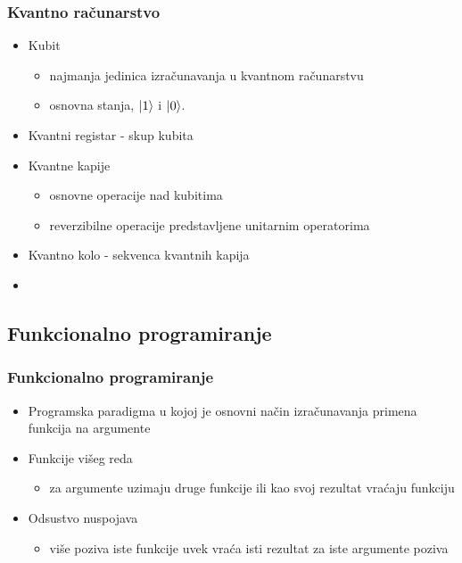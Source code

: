 \documentclass[12pt,hyperref={unicode}]{beamer}
\begin{document}

\begin{frame}
\frametitle{Kvantno računarstvo}
\begin{itemize}
\item{Kubit}
\begin{itemize}
    \item{najmanja jedinica izračunavanja u kvantnom računarstvu}\\
    \item{osnovna stanja, $\ket{1}$ i $\ket{0}$.}\\
    \end{itemize}
\item{Kvantni registar - skup kubita}
\item{Kvantne kapije}
\begin{itemize}
    \item{osnovne operacije nad kubitima}
    \item{reverzibilne operacije predstavljene unitarnim operatorima}
    \end{itemize}
\item{Kvantno kolo - sekvenca kvantnih kapija}
\item{}
\end{itemize}
\end{frame}

\subsection{Funkcionalno programiranje}

\begin{frame}
\frametitle{Funkcionalno programiranje}
\begin{itemize}
\item{Programska paradigma u kojoj je osnovni način izračunavanja primena funkcija na argumente}\cite{p4}
\item{Funkcije višeg reda}
    \begin{itemize}
    \item{za argumente uzimaju druge funkcije ili kao svoj rezultat vraćaju funkciju }
    \end{itemize}
\item{Odsustvo nuspojava}
  	\begin{itemize}
	\item{više poziva iste funkcije uvek vraća isti rezultat za iste argumente poziva}
  	\end{itemize}
\end{itemize}

\end{frame}
\end{document}
